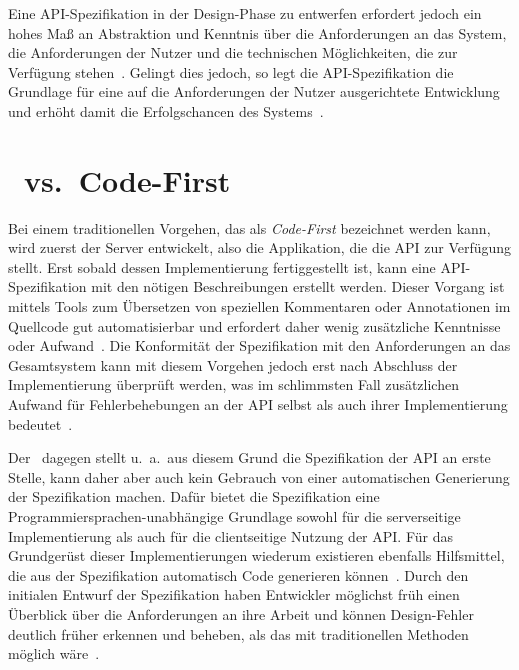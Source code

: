 Eine \ac{API}-Spezifikation in der Design-Phase zu entwerfen erfordert jedoch ein hohes Maß an Abstraktion und Kenntnis über die Anforderungen an das System, die Anforderungen der Nutzer und die technischen Möglichkeiten, die zur Verfügung stehen~\autocite[362]{de23}.
Gelingt dies jedoch, so legt die \ac{API}-Spezifikation die Grundlage für eine auf die Anforderungen der Nutzer ausgerichtete Entwicklung und erhöht damit die Erfolgschancen des Systems~\autocite[1627]{cha21}.

\section{\AF\ vs.\ Code-First}
Bei einem traditionellen Vorgehen, das als \emph{Code-First} bezeichnet werden kann, wird zuerst der Server entwickelt, also die Applikation, die die \ac{API} zur Verfügung stellt.
Erst sobald dessen Implementierung fertiggestellt ist, kann eine \ac{API}-Spezifikation mit den nötigen Beschreibungen erstellt werden.
Dieser Vorgang ist mittels Tools zum Übersetzen von speziellen Kommentaren oder Annotationen im Quellcode gut automatisierbar und erfordert daher wenig zusätzliche Kenntnisse oder Aufwand~\autocite{ope24}.
Die Konformität der Spezifikation mit den Anforderungen an das Gesamtsystem kann mit diesem Vorgehen jedoch erst nach Abschluss der Implementierung überprüft werden, was im schlimmsten Fall zusätzlichen Aufwand für Fehlerbehebungen an der \ac{API} selbst als auch ihrer Implementierung bedeutet~\autocite{vol22}.

Der \AFA\ dagegen stellt u.\ a.\ aus diesem Grund die Spezifikation der \ac{API} an erste Stelle, kann daher aber auch kein Gebrauch von einer automatischen Generierung der Spezifikation machen.
Dafür bietet die Spezifikation eine Programmiersprachen-unabhängige Grundlage sowohl für die serverseitige Implementierung als auch für die clientseitige Nutzung der \ac{API}.
Für das Grundgerüst dieser Implementierungen wiederum existieren ebenfalls Hilfsmittel, die aus der Spezifikation automatisch Code generieren können~\autocite{ope24}.
Durch den initialen Entwurf der Spezifikation haben Entwickler möglichst früh einen Überblick über die Anforderungen an ihre Arbeit und können Design-Fehler deutlich früher erkennen und beheben, als das mit traditionellen Methoden möglich wäre~\autocite[1627]{cha21}.

